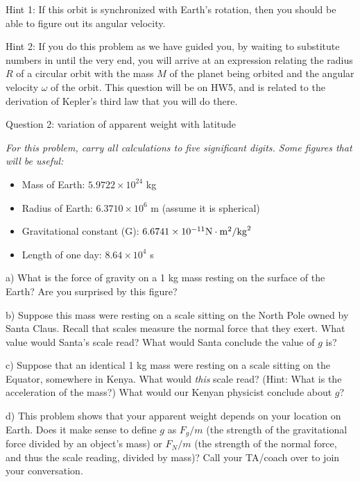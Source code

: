 \documentclass[12pt]{article}
\newcommand{\BI}{\begin{itemize}}
\newcommand{\EI}{\end{itemize}}
\begin{document}
{\sc Hint 1:} If this orbit is synchronized with Earth's rotation, then you should be able to figure out its
angular velocity.

{\sc Hint 2:} If you do this problem as we have guided you, by waiting to substitute numbers in until the 
very end, you will arrive at an expression relating the radius $R$ of a circular orbit with the mass $M$ of the 
planet being orbited and the angular velocity $\omega$ of the orbit. This question will be on HW5, and is related
to the derivation of Kepler's third law that you will do there.

\newpage

\centerline{\Large Question 2: variation of apparent weight with latitude}

\medskip

\it For this problem, carry all calculations to five significant digits. Some figures that will be useful:

\rm
\BI
\item Mass of Earth: $5.9722\times 10^{24}$ kg
\item Radius of Earth: $ 6.3710 \times 10^6$ m (assume it is spherical)
\item Gravitational constant (G): $6.6741 \times 10^{-11} \rm N\cdot \rm m^2/{\rm kg}^2$
\item Length of one day: $8.64 \times 10^4$ s
\EI


a) What is the force of gravity on a 1 kg mass resting on the surface of the Earth? Are you surprised by this figure?


\vspace{2in}

b) Suppose this mass were resting on a scale sitting on the North Pole owned by Santa Claus. Recall that scales measure
the normal force that they exert. What value would Santa's scale read? What would Santa conclude the value of $g$ is?

\vspace{2in}
\newpage
c) Suppose that an identical 1 kg mass were resting on a scale sitting on the Equator, somewhere in Kenya. What would {\it this} scale read? (Hint: What is the acceleration of the mass?) What would our Kenyan physicist conclude about $g$?

\vspace{2in}

d) This problem shows that your apparent weight depends on your location on Earth. 
Does it make sense to define $g$ as $F_g/m$ 
(the strength of the gravitational force divided by an object's mass) or
$F_N/m$ (the strength of the normal force, and thus the scale reading, divided by mass)? Call your TA/coach over to join your conversation.
\end{document}
